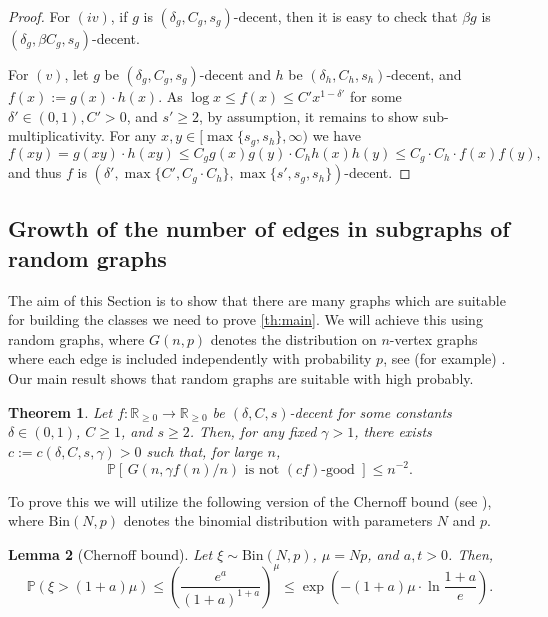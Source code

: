 \documentclass[letterpaper,11pt]{article}
\newcommand{\dec}{decent\xspace}
\newcommand{\Smul}{sub-multiplicativity\xspace}
\newcommand{\Rrr}{\mathbb{R}_{\geq 0}}
\newtheorem{theorem}{Theorem}[section]
\newtheorem{lemma}[theorem]{Lemma}
\theoremstyle{definition}
\theoremstyle{remark}
\renewcommand{\leq}{\leqslant}
\renewcommand{\geq}{\geqslant}
\begin{document}
\begin{proof}
			
			
			For $(iv)$, if $g$ is $(\delta_g,C_g,s_g)$-\dec, then it is easy to check that $\beta g$ is $(\delta_g,\beta C_g,s_g)$-\dec.
			
			
			For $(v)$, let $g$ be $(\delta_g,C_g,s_g)$-\dec and $h$ be $(\delta_h,C_h,s_h)$-\dec, and $f(x):=g(x)\cdot h(x)$. As $\log x \leq f(x) \leq C'x^{1-\delta'}$ for some $\delta' \in (0,1),C'>0 $, and $s'\geq 2$, by assumption, it remains to show \Smul. For any $x,y \in [\max\{s_g,s_h\}, \infty)$  we have
			\[f(xy)=g(xy)\cdot h(xy)\leq C_g g(x)g(y)\cdot C_h h(x)h(y) \leq C_g\cdot C_h\cdot  f(x)f(y),\]  and thus $f$ is $(\delta', \max\{C',C_g\cdot C_h\},\max\{s',s_g,s_h\})$-\dec.
		\end{proof}
		
		
	\subsection{Growth of the number of edges in subgraphs of random graphs}
	\label{sec:Gnp-subgraphs}
 The aim of this Section is to show that there are many graphs which are suitable for building the classes we need to prove \cref{th:main}.  We will achieve this using random graphs, where $G(n,p)$ denotes the distribution on $n$-vertex graphs where each edge is included independently with probability $p$, see (for example) \cite{FriezeKaronski}. Our main result shows that random graphs are suitable with high probably.
 
 
 
	\begin{theorem}\label{th:Gnp-sparsness}
	Let $f : \Rrr \rightarrow \Rrr$ be $(\delta,C,s)$-\dec  for some constants $\delta \in (0,1)$, $C\geq 1$, and $s\geq 2$. Then, for any fixed $ \gamma > 1$, there exists $c:= c(\delta,C,s,\gamma)>0$ such that, for large $n$,
		\[
			\mathbb{P}\left[\, G(n, \gamma  f(n)/n)\text{ is not }(c f)\text{-good } \right] \leq n^{-2}.
		\]
		

	\end{theorem}




To prove this we will utilize the following version of the Chernoff bound (see \cite[Theorem A.1.15]{ProbMethod}), where $\mathrm{Bin}(N,p)$ denotes the binomial distribution with parameters $N$ and $p$. 
\begin{lemma}[Chernoff bound]\label{lem:Chernoff}
	Let $\xi\sim\mathrm{Bin}(N,p)$, $\mu=Np$, and  $a,t>0$. Then, 
	\begin{equation*}  \mathbb{P}(\xi>(1+a)\mu)\leq\left(\frac{e^a}{(1+a)^{1+a}}\right)^{\mu}\leq  \exp \left(-(1+a)\mu\cdot \ln  \frac{1+a}{e}\right).
	\end{equation*} 
\end{lemma}
\end{document}
